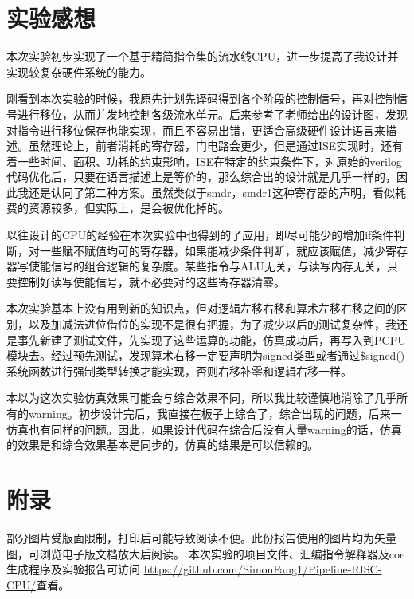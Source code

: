 \documentclass[10pt,a4paper,fleqn]{article}
\newcommand{\song}{\CJKfamily{song}}
\begin{document}
 \section{实验感想}
   \setlength{\parskip}{0.5\baselineskip}
   \par 本次实验初步实现了一个基于精简指令集的流水线CPU，进一步提高了我设计并实现较复杂硬件系统的能力。
   \par 刚看到本次实验的时候，我原先计划先译码得到各个阶段的控制信号，再对控制信号进行移位，从而并发地控制各级流水单元。后来参考了老师给出的设计图，发现对指令进行移位保存也能实现，而且不容易出错，更适合高级硬件设计语言来描述。虽然理论上，前者消耗的寄存器，门电路会更少，但是通过ISE实现时，还有着一些时间、面积、功耗的约束影响，ISE在特定的约束条件下，对原始的verilog代码优化后，只要在语言描述上是等价的，那么综合出的设计就是几乎一样的，因此我还是认同了第二种方案。虽然类似于smdr，smdr1这种寄存器的声明，看似耗费的资源较多，但实际上，是会被优化掉的。
   \par 以往设计的CPU的经验在本次实验中也得到的了应用，即尽可能少的增加if条件判断，对一些赋不赋值均可的寄存器，如果能减少条件判断，就应该赋值，减少寄存器写使能信号的组合逻辑的复杂度。某些指令与ALU无关，与读写内存无关，只要控制好读写使能信号，就不必要对的这些寄存器清零。
   \par 本次实验基本上没有用到新的知识点，但对逻辑左移右移和算术左移右移之间的区别，以及加减法进位借位的实现不是很有把握，为了减少以后的测试复杂性，我还是事先新建了测试文件，先实现了这些运算的功能，仿真成功后，再写入到PCPU模块去。经过预先测试，发现算术右移一定要声明为signed类型或者通过\$signed()系统函数进行强制类型转换才能实现，否则右移补零和逻辑右移一样。
   \par 本以为这次实验仿真效果可能会与综合效果不同，所以我比较谨慎地消除了几乎所有的warning。初步设计完后，我直接在板子上综合了，综合出现的问题，后来一仿真也有同样的问题。因此，如果设计代码在综合后没有大量warning的话，仿真的效果是和综合效果基本是同步的，仿真的结果是可以信赖的。

  \appendix
  \titleformat{\section}{\bf\song}{\thesection}{1em}{}
  \newpage
\section*{附录}
  \par 部分图片受版面限制，打印后可能导致阅读不便。此份报告使用的图片均为矢量图，可浏览电子版文档放大后阅读。
  本次实验的项目文件、汇编指令解释器及coe生成程序及实验报告可访问
  \url{https://github.com/SimonFang1/Pipeline-RISC-CPU/}查看。
\end{document}

